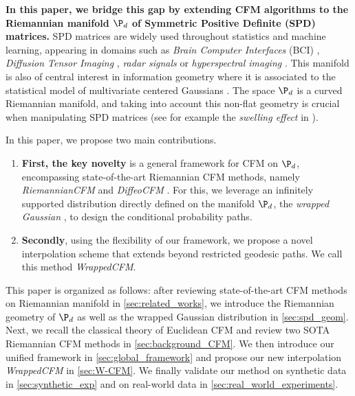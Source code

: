\documentclass[10pt]{article} %
\theoremstyle{plain}
\theoremstyle{definition}
\theoremstyle{remark}
\begin{document}
\textbf{In this paper, we bridge this gap by extending CFM algorithms to the Riemannian manifold $\P_d$ of Symmetric Positive Definite (SPD) matrices.} SPD matrices are widely used throughout statistics and machine learning, appearing in domains such as \emph{Brain Computer Interfaces} (BCI) \citep{lotteReviewClassificationAlgorithms2018}, \emph{Diffusion Tensor Imaging} \citep{pennecManifoldvaluedImageProcessing2020}, \emph{radar signals} \citep{brooks} or \emph{hyperspectral imaging} \citep{russwurm2019breizhcrops}. This manifold is also of central interest in information geometry where it is associated to the statistical model of multivariate centered Gaussians \citep{skovgaardRiemannianGeometryMultivariate1984}. The space $\P_d$ is a curved Riemannian manifold, and taking into account this non-flat geometry is crucial when manipulating SPD matrices (see for example the \emph{swelling effect} in \citealt{arsigny2007geometric}).

In this paper, we propose two main contributions.
\begin{enumerate}
  \item \textbf{First, the key novelty} is a general framework for CFM on $\P_d$, encompassing state-of-the-art Riemannian CFM methods, namely \emph{RiemannianCFM} \citep{chen2024flow} and \emph{DiffeoCFM} \citep{collasRiemannianFlowMatching2025}. For this, we leverage an infinitely supported distribution directly defined on the manifold $\P_d$, the \emph{wrapped Gaussian} \citep{desurrel2025wrappedgaussianmanifoldsymmetric}, to design the conditional probability paths.
  \item \textbf{Secondly}, using the flexibility of our framework, we propose a novel interpolation scheme that extends beyond restricted geodesic paths. We call this method \emph{WrappedCFM}.
\end{enumerate}

This paper is organized as follows: after reviewing state-of-the-art CFM methods on Riemannian manifold in \cref{sec:related_works}, we introduce the Riemannian geometry of $\P_d$ as well as the wrapped Gaussian distribution in \cref{sec:spd_geom}. Next, we recall the classical theory of Euclidean CFM and review two SOTA Riemannian CFM methods in \cref{sec:background_CFM}. We then introduce our unified framework in \cref{sec:global_framework} and propose our new interpolation \emph{WrappedCFM} in \cref{sec:W-CFM}. We finally validate our method on synthetic data in \cref{sec:synthetic_exp} and on real-world data in \cref{sec:real_world_experiments}.
\end{document}
